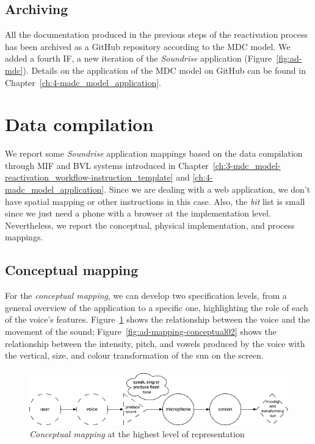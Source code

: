 \subsection*{Archiving}
All the documentation produced in the previous steps of the reactivation process has been archived as a GitHub repository according to the MDC model. We added a fourth IF, a new iteration of the \textit{Soundrise} application (Figure~\ref{fig:ad-mdc}).
Details on the application of the MDC model on GitHub can be found in Chapter~\ref{ch:4-madc_model_application}.

\section{Data compilation}
We report some \textit{Soundrise} application mappings based on the data compilation through MIF and BVL systems introduced in Chapter~\ref{ch:3-mdc_model-reactivation_workflow-instruction_template} and \ref{ch:4-madc_model_application}. Since we are dealing with a web application, we don’t have spatial mapping or other instructions in this case. Also, the \textit{bit} list is small since we just need a phone with a browser at the implementation level. Nevertheless, we report the conceptual, physical implementation, and process mappings.

\subsection*{Conceptual mapping}
For the \textit{conceptual mapping}, we can develop two specification levels, from a general overview of the application to a specific one, highlighting the role of each of the voice’s features. Figure~\ref{fig:ad-mapping-conceptual} shows the relationship between the voice and the movement of the sound; Figure~\ref{fig:ad-mapping-conceptual02} shows the relationship between the intensity, pitch, and vowels produced by the voice with the vertical, size, and colour transformation of the sun on the screen.

\begin{figure}[!h]
    \centering
    \includegraphics[width=\linewidth]{chapters/appendix/d/image/graphd-mapping-conceptual.drawio.png}
    \caption{\textit{Conceptual mapping} at the highest level of representation}
    \label{fig:ad-mapping-conceptual}
\end{figure}

